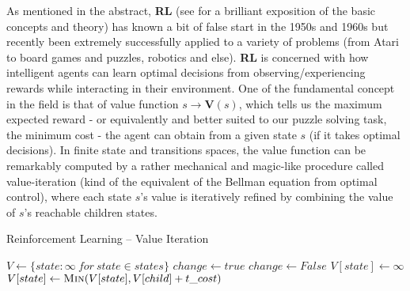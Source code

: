 

\label{sec:RLTheory}

As mentioned in the abstract, \textbf{RL} (see \cite{Sutton1998} for a brilliant exposition of the basic concepts and theory) has known a bit of false start in the 1950s and 1960s but recently been extremely successfully applied to a variety of problems (from Atari to board games and puzzles, robotics and else). \textbf{RL} is concerned with how intelligent agents can learn optimal decisions from observing/experiencing rewards while interacting in their environment. One of the fundamental concept in the field is that of value function $s \to \textbf{V}(s)$, which tells us the maximum expected reward - or equivalently and better suited to our puzzle solving task, the minimum cost - the agent can obtain from a given state $s$ (if it takes optimal decisions). In finite state and transitions spaces, the value function can be remarkably computed by a rather mechanical and magic-like procedure called value-iteration (kind of the equivalent of the Bellman equation from optimal control), where each state $s$'s value is iteratively refined by combining the value of $s$'s reachable children states.


\teal
\begin{algorithm}[H]
\caption{Reinforcement Learning -- Value Iteration}\label{alg:RLTheory}
\begin{algorithmic}
 \teal {} \black
\State $V \gets \{state: \infty \ for \ state \in states\}$
\State $change \gets true$
\State $change \gets False$
	\State $V[state] \gets \infty$
	\State $V[state] \gets \Call{Min}{V[state], V[child] + t\_cost}$
	\EndFor
	\EndIf
\EndFor
\EndWhile
{}
\EndFunction
\end{algorithmic}
\end{algorithm}
\black






